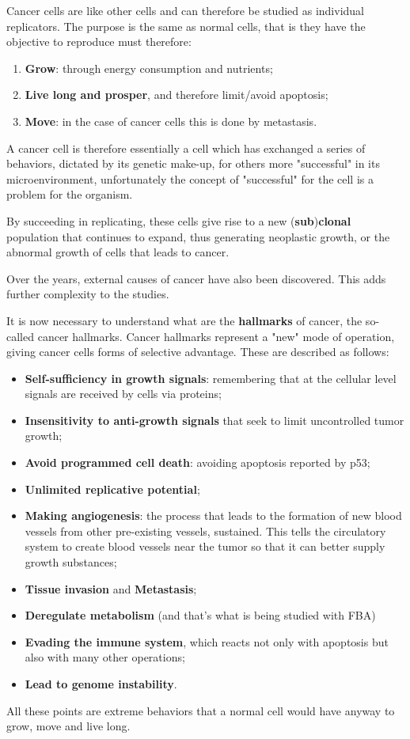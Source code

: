 Cancer cells are like other cells and can therefore be studied as individual replicators. 
The purpose is the same as normal cells, that is they have the objective to reproduce must
therefore:
\begin{enumerate}
    \item \textbf{Grow}: through energy consumption and nutrients;
    \item \textbf{Live long and prosper}, and therefore limit/avoid apoptosis;
    \item \textbf{Move}: in the case of cancer cells this is done by metastasis.
\end{enumerate}
A cancer cell is therefore essentially a cell which has exchanged a series of behaviors, 
dictated by its genetic make-up, for others more "successful" in its microenvironment,
unfortunately the concept of "successful" for the cell is a problem for the organism. 

By succeeding in replicating, these cells give rise to a new (\textbf{sub})\textbf{clonal}
population that continues to expand, thus generating neoplastic growth, or the abnormal 
growth of cells that leads to cancer.

Over the years, external causes of cancer have also been discovered. This adds further 
complexity to the studies.

It is now necessary to understand what are the \textbf{hallmarks} of cancer, the so-called 
cancer hallmarks. Cancer hallmarks represent a "new" mode of operation, giving cancer cells 
forms of selective advantage. These are described as follows:
\begin{itemize}
    \item \textbf{Self-sufficiency in growth signals}: remembering that at the cellular level
        signals are received by cells via proteins;
    \item \textbf{Insensitivity to anti-growth signals} that seek to limit uncontrolled tumor
        growth;
    \item \textbf{Avoid programmed cell death}: avoiding apoptosis reported by p53;
    \item \textbf{Unlimited replicative potential};
    \item \textbf{Making angiogenesis}: the process that leads to the formation of new blood
        vessels from other pre-existing vessels, sustained. This tells the circulatory system to 
        create blood vessels near the tumor so that it can better supply growth substances;
    \item \textbf{Tissue invasion} and \textbf{Metastasis};
    \item \textbf{Deregulate metabolism} (and that's what is being studied with FBA)
    \item \textbf{Evading the immune system}, which reacts not only with apoptosis but also 
        with many other operations;
    \item \textbf{Lead to genome instability}.
\end{itemize}
All these points are extreme behaviors that a normal cell would have anyway to grow, move 
and live long.

